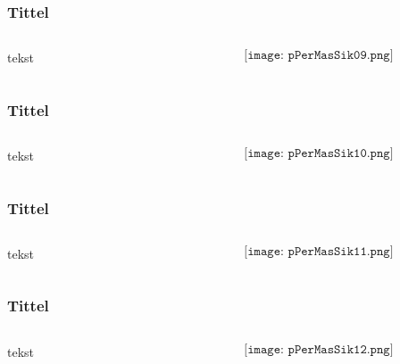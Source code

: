 \documentclass[aspectratio=169,xcolor=dvipsnames]{beamer}
\begin{document}
\begin{frame}
	\frametitle{Tittel}
	\begin{columns}
		\begin{column}{0.5\textwidth}
tekst
			
		\end{column}

		\begin{column}{0.5\textwidth}
	$$\texttt{[image: pPerMasSik09.png]}$$
		\end{column}
	\end{columns}
\end{frame}

\begin{frame}
	\frametitle{Tittel}
	\begin{columns}
		\begin{column}{0.5\textwidth}
tekst
			
		\end{column}

		\begin{column}{0.5\textwidth}
	$$\texttt{[image: pPerMasSik10.png]}$$
		\end{column}
	\end{columns}
\end{frame}

\begin{frame}
	\frametitle{Tittel}
	\begin{columns}
		\begin{column}{0.5\textwidth}
tekst
			
		\end{column}

		\begin{column}{0.5\textwidth}
	$$\texttt{[image: pPerMasSik11.png]}$$
		\end{column}
	\end{columns}
\end{frame}

\begin{frame}
	\frametitle{Tittel}
	\begin{columns}
		\begin{column}{0.5\textwidth}
tekst
			
		\end{column}

		\begin{column}{0.5\textwidth}
	$$\texttt{[image: pPerMasSik12.png]}$$
		\end{column}
	\end{columns}
\end{frame}
\end{document}
